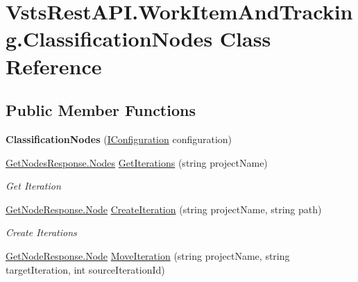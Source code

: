 \hypertarget{class_vsts_rest_a_p_i_1_1_work_item_and_tracking_1_1_classification_nodes}{}\section{Vsts\+Rest\+A\+P\+I.\+Work\+Item\+And\+Tracking.\+Classification\+Nodes Class Reference}
\label{class_vsts_rest_a_p_i_1_1_work_item_and_tracking_1_1_classification_nodes}
\subsection*{Public Member Functions}
\begin{DoxyCompactItemize}
\item 
\mbox{\label{class_vsts_rest_a_p_i_1_1_work_item_and_tracking_1_1_classification_nodes_a56901e63fcddff8c3b672404bcd45bfe}} 
{\bfseries Classification\+Nodes} (\mbox{\hyperlink{interface_vsts_rest_a_p_i_1_1_i_configuration}{I\+Configuration}} configuration)
\item 
\mbox{\hyperlink{class_vsts_rest_a_p_i_1_1_viewmodel_1_1_work_item_1_1_get_nodes_response_1_1_nodes}{Get\+Nodes\+Response.\+Nodes}} \mbox{\hyperlink{class_vsts_rest_a_p_i_1_1_work_item_and_tracking_1_1_classification_nodes_a9b9f298f8ae6cf16fcc809c69f99533a}{Get\+Iterations}} (string project\+Name)
\begin{DoxyCompactList}\small\item\em Get Iteration \end{DoxyCompactList}\item 
\mbox{\hyperlink{class_vsts_rest_a_p_i_1_1_viewmodel_1_1_work_item_1_1_get_node_response_1_1_node}{Get\+Node\+Response.\+Node}} \mbox{\hyperlink{class_vsts_rest_a_p_i_1_1_work_item_and_tracking_1_1_classification_nodes_ae8b553aaddd3dbd6d03d9ed7400b0667}{Create\+Iteration}} (string project\+Name, string path)
\begin{DoxyCompactList}\small\item\em Create Iterations \end{DoxyCompactList}\item 
\mbox{\hyperlink{class_vsts_rest_a_p_i_1_1_viewmodel_1_1_work_item_1_1_get_node_response_1_1_node}{Get\+Node\+Response.\+Node}} \mbox{\hyperlink{class_vsts_rest_a_p_i_1_1_work_item_and_tracking_1_1_classification_nodes_a34362d25882c3145b7134f08bf8aae86}{Move\+Iteration}} (string project\+Name, string target\+Iteration, int source\+Iteration\+Id)

\end{DoxyCompactItemize}
